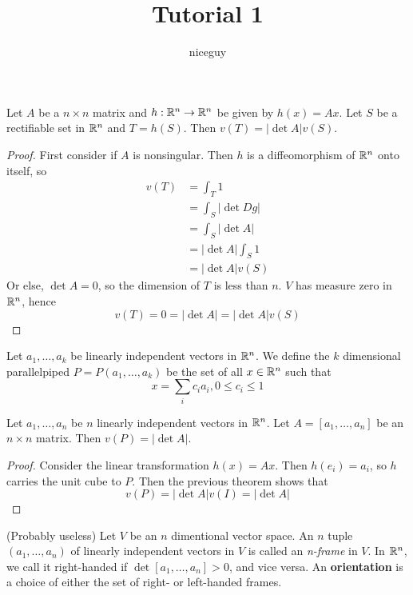 \documentclass[12pt]{article}
\title{Tutorial 1}
\author{niceguy}
\begin{document}
\maketitle

\begin{thm}
    Let $A$ be a $n \times n$ matrix and $h:\mathbb{R}^n \rightarrow \mathbb{R}^n$ be given by $h(x) = Ax$. Let $S$ be a rectifiable set in $\mathbb{R}^n$ and $T = h(S)$. Then $v(T) = |\det A|v(S)$.
\end{thm}

\begin{proof}
    First consider if $A$ is nonsingular. Then $h$ is a diffeomorphism of $\mathbb{R}^n$ onto itself, so
    \begin{align*}
        v(T) &= \int_T 1 \\
             &= \int_S |\det Dg| \\
             &= \int_S |\det A| \\
             &= |\det A| \int_S 1 \\
             &= |\det A| v(S)
    \end{align*}
    Or else, $\det A = 0$, so the dimension of $T$ is less than $n$. $V$ has measure zero in $\mathbb{R}^n$, hence
    $$v(T) = 0 = |\det A| = |\det A| v(S)$$
\end{proof}

\begin{defn}
    Let $a_1, \dots, a_k$ be linearly independent vectors in $\mathbb{R}^n$. We define the $k$ dimensional parallelpiped $P = P(a_1, \dots, a_k)$ be the set of all $x \in \mathbb{R}^n$ such that
    $$x = \sum_i c_i a_i, 0 \leq c_i \leq 1$$
\end{defn}

\begin{thm}
    Let $a_1, \dots, a_n$ be $n$ linearly independent vectors in $\mathbb{R}^n$. Let $A = [a_1, \dots, a_n]$ be an $n\times n$ matrix. Then $v(P) = |\det A|$.
\end{thm}

\begin{proof}
    Consider the linear transformation $h(x) = Ax$. Then $h(e_i) = a_i$, so $h$ carries the unit cube to $P$. Then the previous theorem shows that
    $$v(P) = |\det A|v(I) = |\det A|$$
\end{proof}

\begin{defn}
    (Probably useless) Let $V$ be an $n$ dimentional vector space. An $n$ tuple $(a_1, \dots, a_n)$ of linearly independent vectors in $V$ is called an \textit{n-frame} in $V$. In $\mathbb{R}^n$, we call it right-handed if $\det[a_1, \dots, a_n] > 0$, and vice versa. An \textbf{orientation} is a choice of either the set of right- or left-handed frames.
\end{defn}
\end{document}
